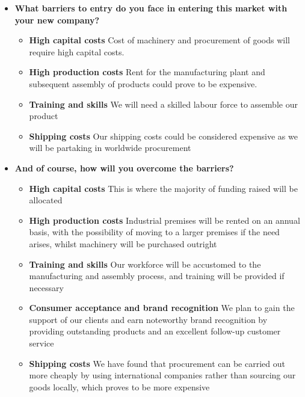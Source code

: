 \documentclass[a4paper,11pt]{article}
\begin{document}
\begin{itemize}
	\item \textbf{What barriers to entry do you face in entering this market with your new company?}
	
	\begin{itemize}
		\item \textbf{High capital costs} Cost of machinery and procurement of goods will require high capital costs.
		
		\item \textbf{High production costs} Rent for the manufacturing plant and subsequent assembly of products could prove to be expensive.
		
		\item \textbf{Training and skills} We will need a skilled labour force to assemble our product
		
		\item \textbf{Shipping costs} Our shipping costs could be considered expensive as we will be partaking in worldwide procurement
	\end{itemize}
	
	\item \textbf{And of course, how will you overcome the barriers?}
	
	\begin{itemize}
		\item \textbf{High capital costs} This is where the majority of funding raised will be allocated
		
		\item \textbf{High production costs} Industrial premises will be rented on an annual basis, with the possibility of moving to a larger premises if the need arises, whilst machinery will be purchased outright
		
		\item \textbf{Training and skills} Our workforce will be accustomed to the manufacturing and assembly process, and training will be provided if necessary
		
		\item \textbf{Consumer acceptance and brand recognition} We plan to gain the support of our clients and earn noteworthy brand recognition by providing outstanding products and an excellent follow-up customer service
		
		\item \textbf{Shipping costs} We have found that procurement can be carried out more cheaply by using international companies rather than sourcing our goods locally, which proves to be more expensive
	\end{itemize}
	

\end{itemize}
\end{document}
